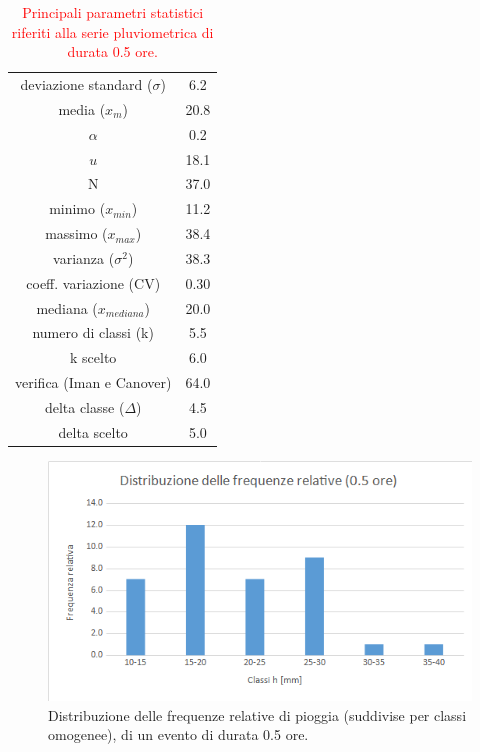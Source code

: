 \begin{table}[H] \centering
    \caption{\textcolor{red}{Principali parametri statistici riferiti alla serie pluviometrica di durata 0.5 ore.}}
 \begin{tabular}{cc}
    \toprule
deviazione standard ($\sigma$) & 6.2  \\
media ($x_m$)              & 20.8 \\
$\alpha$            & 0.2  \\
$u$           & 18.1\\
N                & 37.0 \\
minimo ($x_{min}$)             & 11.2 \\
massimo ($x_{max}$)            & 38.4 \\
varianza ($\sigma^2$)             & 38.3 \\
coeff. variazione (CV)    & 0.30 \\
mediana ($x_{mediana}$)        & 20.0 \\
numero di classi (k)      & 5.5  \\
k scelto                 & 6.0  \\
verifica (Iman e Canover) & 64.0 \\
delta classe ($\Delta$)          & 4.5  \\
delta scelto             & 5.0 \\
        \bottomrule
        \end{tabular}
\end{table}    

\begin{figure}[H]\centering
    \includegraphics[scale=.6]{immagini/freq_piogg_rel_05ore.png}
    \caption{Distribuzione delle frequenze relative di pioggia (suddivise per classi omogenee), di un evento di durata 0.5 ore.}
  \label{freq_rel_piogg_05ore}
\end{figure}

